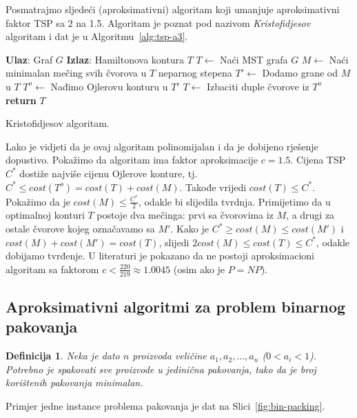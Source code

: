 \documentclass[a4paper, utf8, 11pt, colorlinks]{book}
\newtheorem{definition}{Definicija}
\begin{document}
Posmatrajmo sljedeći (aproksimativni) algoritam koji umanjuje aproksimativni faktor TSP sa $2$ na 1.5. Algoritam je poznat pod nazivom \emph{Kristofidjesov} algoritam i dat je u Algoritmu~\ref{alg:tsp-a3}.

\begin{algorithm}[H] 

	\begin{algorithmic}[1]
		\STATE \textbf{Ulaz}: Graf $G$
		\STATE \textbf{Izlaz}: Hamiltonova kontura $T$ 
		\STATE $T \gets$ Naći MST grafa $G$
		\STATE $M \gets$ Naći minimalan mečing svih čvorova u $T$ neparnog stepena
		\STATE $T' \gets$ Dodamo grane od $M$ u $T$
		\STATE $T^o\gets$ Nađimo Ojlerovu konturu u $T'$
		\STATE $T \gets$ Izbaciti duple čvorove iz $T^o$
		\STATE \textbf{return} $T$
	\end{algorithmic}	
    \caption{Kristofidjesov algoritam.}
    \label{alg:tsp-a3}
\end{algorithm}
  Lako je vidjeti da je ovaj algoritam polinomijalan i da je dobijeno rješenje dopustivo.
 Pokažimo da algoritam ima faktor aproksimacije $c=1.5$.  Cijena TSP $C^*$ dostiže najviše cijenu Ojlerove konture, tj.  $C^*\leq cost(T^o) = cost(T) + cost(M)$.  Takođe vrijedi $cost(T) \leq C^*$. Pokažimo da je $cost(M) \leq  \frac{C^*}{2}$, odakle bi slijedila tvrdnja. Primijetimo da u optimalnoj konturi $T$ postoje dva mečinga: prvi sa čvorovima iz $M$, a drugi za ostale čvorove kojeg označavamo sa $M'$. 
 Kako je $C^* \geq cost(M) \leq cost(M')$ i $cost(M) + cost(M') = cost(T)$, slijedi 
 $2 cost(M) \leq cost(T) \leq C^*$, odakle dobijamo tvrđenje.  U literaturi je pokazano da ne postoji  aproksimacioni algoritam sa faktorom  $c < \frac{220}{219} \approx 1.0045$ (osim ako je $P=NP$). 
 
 
 \subsection{Aproksimativni algoritmi za problem binarnog pakovanja}
\begin{definition}
    Neka je dato $n$ proizvoda veličine $a_1,a_2,\ldots,a_n$ ($0<a_i<1$). Potrebno je spakovati sve proizvode u jedinična pakovanja, tako da je broj korištenih pakovanja minimalan.  
\end{definition} 

  Primjer jedne instance problema pakovanja je dat na Slici~\ref{fig:bin-packing}.
\end{document}
